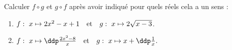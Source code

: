 
\begin{exercice}  \; Calculer $f\circ g$ et $g\circ f$ apr\`es avoir indiqu\'e pour quels r\'eels cela a un sens :
\begin{enumerate}
\item $f:\ x\mapsto 2x^2-x+1\quad \hbox{et}\quad g:\ x\mapsto 2\sqrt{x-3}$.
\item $f:\ x\mapsto \ddp\frac{2x^2-8}{x}\quad\hbox{et}\quad g:\ x\mapsto x+\ddp\frac{1}{x}.$
\end{enumerate}
\end{exercice}